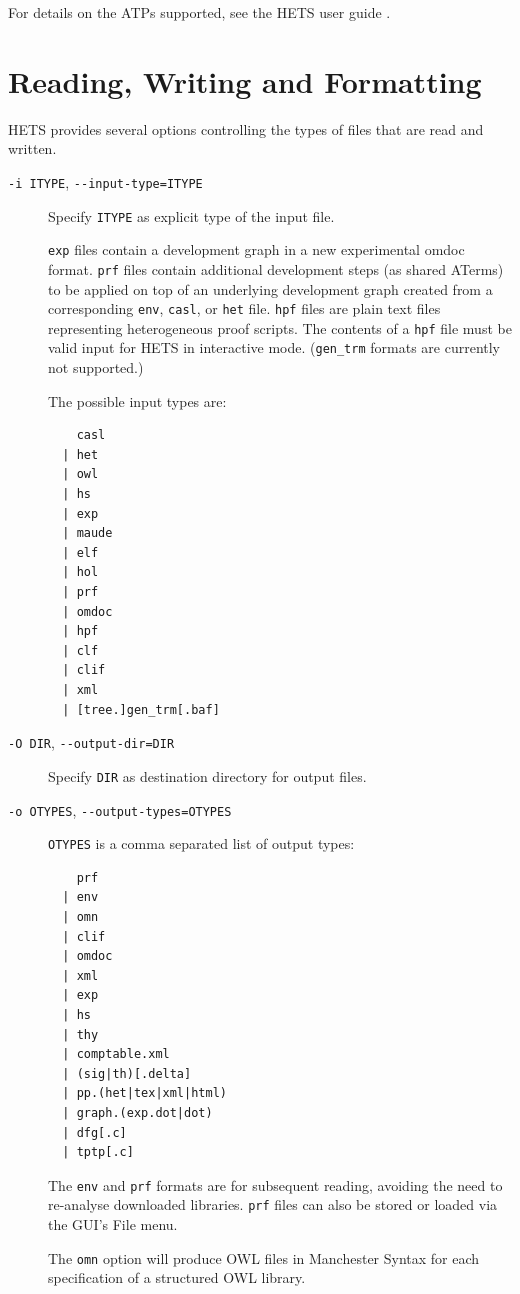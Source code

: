 \documentclass{article}
\newcommand{\normalTEXTSC}[2]{{#1\scriptsize#2}}
\newcommand     {\Hets}{\normalTEXTSC{H}{ETS}\xspace}
\begin{document}
For details on the ATPs supported, see the \Hets user guide \cite{HetsUserGuide}.

\section{Reading, Writing and Formatting}

\Hets provides several options controlling the types of files
that are read and written.
\begin{description}
\item[\texttt{-i ITYPE}, \texttt{-{}-input-type=ITYPE}] Specify \texttt{ITYPE}
  as explicit type of the input file. 

  \texttt{exp} files contain a development graph in a new experimental omdoc
  format.  \texttt{prf} files contain additional development steps (as shared
  ATerms) to be applied on top of an underlying development graph created from
  a corresponding \texttt{env}, \texttt{casl}, or \texttt{het}
  file. \texttt{hpf} files are plain text files representing heterogeneous
  proof scripts. The contents of a \texttt{hpf} file must be valid input for
  \Hets in interactive mode.  (\texttt{gen\_trm} formats are currently not
  supported.)

The possible input types are:
\begin{lstlisting}
    casl
  | het
  | owl
  | hs
  | exp
  | maude
  | elf
  | hol
  | prf
  | omdoc
  | hpf
  | clf
  | clif
  | xml
  | [tree.]gen_trm[.baf]
\end{lstlisting}

\item[\texttt{-O DIR}, \texttt{-{}-output-dir=DIR}]
Specify \texttt{DIR} as destination directory for output files.

\item[\texttt{-o OTYPES}, \texttt{-{}-output-types=OTYPES}]
\texttt{OTYPES} is a comma separated list of output types:
\begin{lstlisting}
    prf
  | env
  | omn
  | clif
  | omdoc
  | xml
  | exp
  | hs
  | thy
  | comptable.xml
  | (sig|th)[.delta]
  | pp.(het|tex|xml|html)
  | graph.(exp.dot|dot)
  | dfg[.c]
  | tptp[.c]
\end{lstlisting}
The \texttt{env} and \texttt{prf} formats are for subsequent reading,
avoiding the need to re-analyse downloaded libraries. \texttt{prf} files
can also be stored or loaded via the GUI's File menu.

The \texttt{omn} option \cite{books/sp/Kohlhase06} will produce OWL files in
Manchester Syntax for each specification of a structured OWL library.


\end{description}
\end{document}
